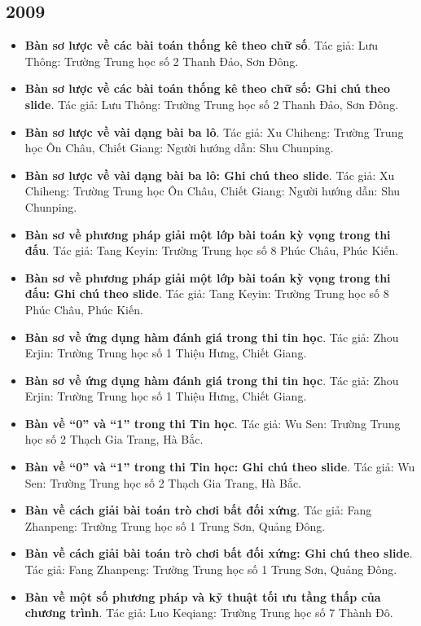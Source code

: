 \documentclass[11pt]{article}
\begin{document}
\subsection{2009}
\begin{itemize}[leftmargin=2em]
  \item \textbf{Bàn sơ lược về các bài toán thống kê theo chữ số}. Tác giả: Lưu Thông: Trường Trung học số 2 Thanh Đảo, Sơn Đông.
  \item \textbf{Bàn sơ lược về các bài toán thống kê theo chữ số: Ghi chú theo slide}. Tác giả: Lưu Thông: Trường Trung học số 2 Thanh Đảo, Sơn Đông.
  \item \textbf{Bàn sơ lược về vài dạng bài ba lô}. Tác giả: Xu Chiheng: Trường Trung học Ôn Châu, Chiết Giang: Người hướng dẫn: Shu Chunping.
  \item \textbf{Bàn sơ lược về vài dạng bài ba lô: Ghi chú theo slide}. Tác giả: Xu Chiheng: Trường Trung học Ôn Châu, Chiết Giang: Người hướng dẫn: Shu Chunping.
  \item \textbf{Bàn sơ về phương pháp giải một lớp bài toán kỳ vọng trong thi đấu}. Tác giả: Tang Keyin: Trường Trung học số 8 Phúc Châu, Phúc Kiến.
  \item \textbf{Bàn sơ về phương pháp giải một lớp bài toán kỳ vọng trong thi đấu: Ghi chú theo slide}. Tác giả: Tang Keyin: Trường Trung học số 8 Phúc Châu, Phúc Kiến.
  \item \textbf{Bàn sơ về ứng dụng hàm đánh giá trong thi tin học}. Tác giả: Zhou Erjin: Trường Trung học số 1 Thiệu Hưng, Chiết Giang.
  \item \textbf{Bàn sơ về ứng dụng hàm đánh giá trong thi tin học}. Tác giả: Zhou Erjin: Trường Trung học số 1 Thiệu Hưng, Chiết Giang.
  \item \textbf{Bàn về ``0'' và ``1'' trong thi Tin học}. Tác giả: Wu Sen: Trường Trung học số 2 Thạch Gia Trang, Hà Bắc.
  \item \textbf{Bàn về ``0'' và ``1'' trong thi Tin học: Ghi chú theo slide}. Tác giả: Wu Sen: Trường Trung học số 2 Thạch Gia Trang, Hà Bắc.
  \item \textbf{Bàn về cách giải bài toán trò chơi bất đối xứng}. Tác giả: Fang Zhanpeng: Trường Trung học số 1 Trung Sơn, Quảng Đông.
  \item \textbf{Bàn về cách giải bài toán trò chơi bất đối xứng: Ghi chú theo slide}. Tác giả: Fang Zhanpeng: Trường Trung học số 1 Trung Sơn, Quảng Đông.
  \item \textbf{Bàn về một số phương pháp và kỹ thuật tối ưu tầng thấp của chương trình}. Tác giả: Luo Keqiang: Trường Trung học số 7 Thành Đô.

\end{itemize}
\end{document}
